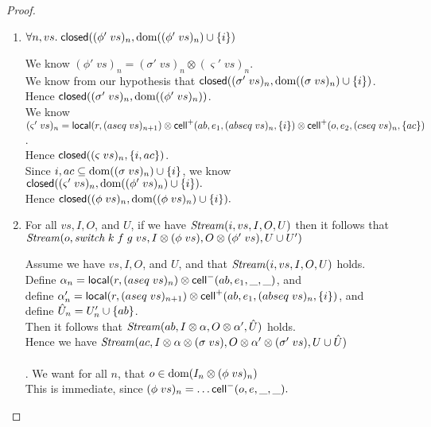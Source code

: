 \begin{proof}
\begin{enumerate}
\item $\forall n, vs.\; \mathsf{closed}({(\phi'\;vs)_n}, {\mbox{dom}({(\phi'\;vs)_n}) \cup \{{i}\}})$ 

  We know $(\phi'\;vs)_n = (\sigma'\;vs)_n \otimes (\varsigma'\;vs)_n$. \\
  We know from our hypothesis that $\mathsf{closed}({(\sigma'\;vs)_n}, {\mbox{dom}({(\sigma\;vs)_n}) \cup \{{i}\}})$. \\
  Hence $\mathsf{closed}({(\sigma'\;vs)_n}, {\mbox{dom}({(\phi'\;vs)_n})})$. \\
  We know $(\varsigma'\;vs)_n = \mathsf{local}({r}, {(aseq\;vs)_{n+1}}) \otimes 
                                \mathsf{cell}^{+}({ab}, {e_1}, {(abseq\;vs)_n}, {\{{i}\}}) \otimes \\
                                \mathsf{cell}^{+}({o}, {e_2}, {(cseq\;vs)_n}, {\{{ac}\}})$. \\
  Hence $\mathsf{closed}({(\varsigma\;vs)_n}, {\{{i, ac}\}})$. \\
  Since ${i,ac} \subseteq \mbox{dom}({(\sigma\;vs)_n}) \cup \{{i}\}$, 
  we know $\mathsf{closed}({(\varsigma'\;vs)_n}, {\mbox{dom}({(\phi'\;vs)_n}) \cup \{{i}\}}).$ \\
  Hence $\mathsf{closed}({(\phi\;vs)_n}, {\mbox{dom}({(\phi\;vs)_n}) \cup \{{i}\}}).$
 

\item For all $vs, I, O$, and $U$, if we have $\mathit{Stream}(i, vs, I, O, U)$ then it follows that $\mathit{Stream}(o, \mathit{switch}\;k\;f\;g\;vs, I \otimes (\phi\;vs), O \otimes (\phi'\;vs), U \cup U')$
  \begin{tabbedproof}
    Assume we have $vs, I, O$, and $U$, and that $\mathit{Stream}(i, vs, I, O, U)$ holds. \\
    
  \oo Define $\alpha_n = \mathsf{local}({r}, {(aseq\;vs)_n}) \otimes \mathsf{cell}^{-}({ab}, {e_1}, {\_}, {\_})$, and \\
  \oo define $\alpha'_n = \mathsf{local}({r}, {(aseq\;vs)_{n+1}}) \otimes \mathsf{cell}^{+}({ab}, {e_1}, {(abseq\;vs)_n}, {\{{i}\}})$, and \\
  \oo define $\hat{U}_n = U'_n \cup \{{ab}\}$. \\
  \oo Then it follows that $\mathit{Stream}(ab, I \otimes \alpha, O \otimes \alpha', \hat{U})$ holds. \\
  \oo Hence we have $\mathit{Stream}(ac, I \otimes \alpha \otimes (\sigma\;vs), O \otimes \alpha' \otimes (\sigma'\;vs), U \cup \hat{U})$\\

  \\ . We want for all $n$, that $o \in \mbox{dom}({I_n \otimes (\phi\;vs)_n})$ \\
  \ooo This is immediate, since $(\phi\;vs)_n = \ldots \mathsf{cell}^{-}({o}, {e}, {\_}, {\_}).$ \\ 


\end{tabbedproof}
\end{enumerate}
\end{proof}
